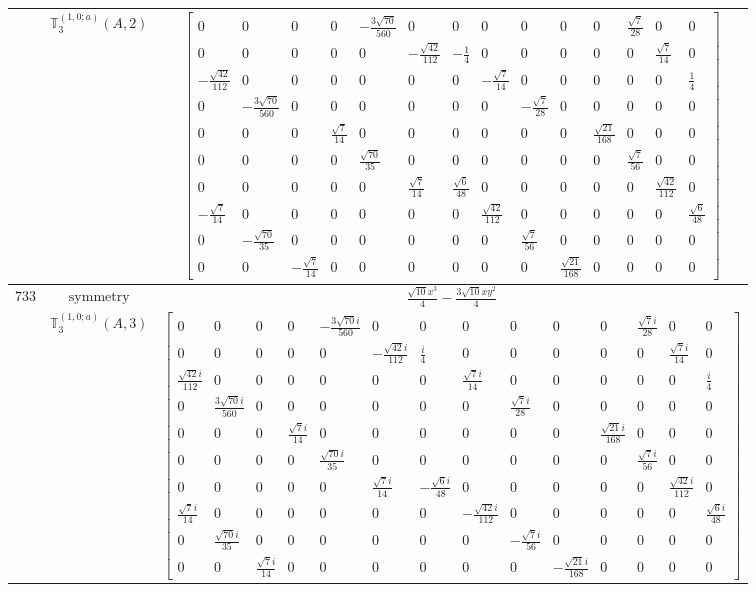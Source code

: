 \documentclass[fleqn,8pt,landscape]{jsarticle}
\begin{document}
\begin{longtable}{ccc}
$  $ & $ \mathbb{T}_{3}^{(1,0;a)}(A,2) $ & $ \begin{bmatrix} 0 & 0 & 0 & 0 & - \frac{3 \sqrt{70}}{560} & 0 & 0 & 0 & 0 & 0 & 0 & \frac{\sqrt{7}}{28} & 0 & 0 \\ 0 & 0 & 0 & 0 & 0 & - \frac{\sqrt{42}}{112} & - \frac{1}{4} & 0 & 0 & 0 & 0 & 0 & \frac{\sqrt{7}}{14} & 0 \\ - \frac{\sqrt{42}}{112} & 0 & 0 & 0 & 0 & 0 & 0 & - \frac{\sqrt{7}}{14} & 0 & 0 & 0 & 0 & 0 & \frac{1}{4} \\ 0 & - \frac{3 \sqrt{70}}{560} & 0 & 0 & 0 & 0 & 0 & 0 & - \frac{\sqrt{7}}{28} & 0 & 0 & 0 & 0 & 0 \\ 0 & 0 & 0 & \frac{\sqrt{7}}{14} & 0 & 0 & 0 & 0 & 0 & 0 & \frac{\sqrt{21}}{168} & 0 & 0 & 0 \\ 0 & 0 & 0 & 0 & \frac{\sqrt{70}}{35} & 0 & 0 & 0 & 0 & 0 & 0 & \frac{\sqrt{7}}{56} & 0 & 0 \\ 0 & 0 & 0 & 0 & 0 & \frac{\sqrt{7}}{14} & \frac{\sqrt{6}}{48} & 0 & 0 & 0 & 0 & 0 & \frac{\sqrt{42}}{112} & 0 \\ - \frac{\sqrt{7}}{14} & 0 & 0 & 0 & 0 & 0 & 0 & \frac{\sqrt{42}}{112} & 0 & 0 & 0 & 0 & 0 & \frac{\sqrt{6}}{48} \\ 0 & - \frac{\sqrt{70}}{35} & 0 & 0 & 0 & 0 & 0 & 0 & \frac{\sqrt{7}}{56} & 0 & 0 & 0 & 0 & 0 \\ 0 & 0 & - \frac{\sqrt{7}}{14} & 0 & 0 & 0 & 0 & 0 & 0 & \frac{\sqrt{21}}{168} & 0 & 0 & 0 & 0 \end{bmatrix} $ \\ \hline
$ 733 $ & $ \text{symmetry} $ & $ \frac{\sqrt{10} x^{3}}{4} - \frac{3 \sqrt{10} x y^{2}}{4} $ \\
$  $ & $ \mathbb{T}_{3}^{(1,0;a)}(A,3) $ & $ \begin{bmatrix} 0 & 0 & 0 & 0 & - \frac{3 \sqrt{70} i}{560} & 0 & 0 & 0 & 0 & 0 & 0 & \frac{\sqrt{7} i}{28} & 0 & 0 \\ 0 & 0 & 0 & 0 & 0 & - \frac{\sqrt{42} i}{112} & \frac{i}{4} & 0 & 0 & 0 & 0 & 0 & \frac{\sqrt{7} i}{14} & 0 \\ \frac{\sqrt{42} i}{112} & 0 & 0 & 0 & 0 & 0 & 0 & \frac{\sqrt{7} i}{14} & 0 & 0 & 0 & 0 & 0 & \frac{i}{4} \\ 0 & \frac{3 \sqrt{70} i}{560} & 0 & 0 & 0 & 0 & 0 & 0 & \frac{\sqrt{7} i}{28} & 0 & 0 & 0 & 0 & 0 \\ 0 & 0 & 0 & \frac{\sqrt{7} i}{14} & 0 & 0 & 0 & 0 & 0 & 0 & \frac{\sqrt{21} i}{168} & 0 & 0 & 0 \\ 0 & 0 & 0 & 0 & \frac{\sqrt{70} i}{35} & 0 & 0 & 0 & 0 & 0 & 0 & \frac{\sqrt{7} i}{56} & 0 & 0 \\ 0 & 0 & 0 & 0 & 0 & \frac{\sqrt{7} i}{14} & - \frac{\sqrt{6} i}{48} & 0 & 0 & 0 & 0 & 0 & \frac{\sqrt{42} i}{112} & 0 \\ \frac{\sqrt{7} i}{14} & 0 & 0 & 0 & 0 & 0 & 0 & - \frac{\sqrt{42} i}{112} & 0 & 0 & 0 & 0 & 0 & \frac{\sqrt{6} i}{48} \\ 0 & \frac{\sqrt{70} i}{35} & 0 & 0 & 0 & 0 & 0 & 0 & - \frac{\sqrt{7} i}{56} & 0 & 0 & 0 & 0 & 0 \\ 0 & 0 & \frac{\sqrt{7} i}{14} & 0 & 0 & 0 & 0 & 0 & 0 & - \frac{\sqrt{21} i}{168} & 0 & 0 & 0 & 0 \end{bmatrix} $ \\ \hline

\end{longtable}
\end{document}
